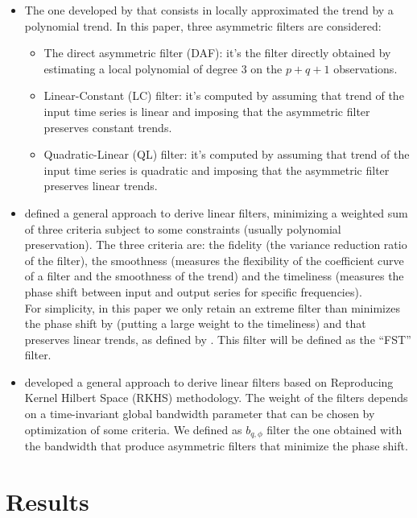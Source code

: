 \documentclass[
  12pt,
  ,
  a4paper]{article}
\begin{document}
\begin{itemize}
\item
  The one developed by \citet{proietti2008} that consists in locally approximated the trend by a polynomial trend.
  In this paper, three asymmetric filters are considered:

  \begin{itemize}
  \item
    The direct asymmetric filter (DAF): it's the filter directly obtained by estimating a local polynomial of degree 3 on the \(p+q+1\) observations.
  \item
    Linear-Constant (LC) filter: it's computed by assuming that trend of the input time series is linear and imposing that the asymmetric filter preserves constant trends.
  \item
    Quadratic-Linear (QL) filter: it's computed by assuming that trend of the input time series is quadratic and imposing that the asymmetric filter preserves linear trends.
  \end{itemize}
\item
  \citet{ch15HBSA} defined a general approach to derive linear filters, minimizing a weighted sum of three criteria subject to some constraints (usually polynomial preservation).
  The three criteria are: the fidelity (the variance reduction ratio of the filter), the smoothness (measures the flexibility of the coefficient curve of a filter and the smoothness of the trend) and the timeliness (measures the phase shift between input and output series for specific frequencies).\\
  For simplicity, in this paper we only retain an extreme filter than minimizes the phase shift by (putting a large weight to the timeliness) and that preserves linear trends, as defined by \citet{ch15HBSA}.
  This filter will be defined as the ``FST'' filter.
\item
  \citet{dagumbianconcini2008} developed a general approach to derive linear filters based on Reproducing Kernel Hilbert Space (RKHS) methodology.
  The weight of the filters depends on a time-invariant global bandwidth parameter that can be chosen by optimization of some criteria.
  We defined as \(b_{q,\phi}\) filter the one obtained with the bandwidth that produce asymmetric filters that minimize the phase shift.
\end{itemize}

\hypertarget{results}{%
\section{Results}\label{results}}
\end{document}
